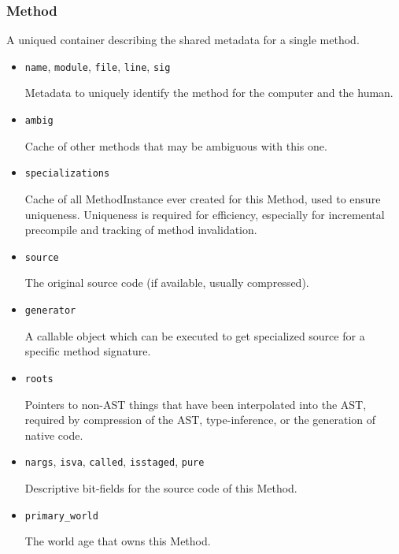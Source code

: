 \hypertarget{10862348325946528961}{}


\subsubsection{Method}



A unique{\textquotesingle}d container describing the shared metadata for a single method.



\begin{itemize}
\item \texttt{name}, \texttt{module}, \texttt{file}, \texttt{line}, \texttt{sig}

Metadata to uniquely identify the method for the computer and the human.


\item \texttt{ambig}

Cache of other methods that may be ambiguous with this one.


\item \texttt{specializations}

Cache of all MethodInstance ever created for this Method, used to ensure uniqueness. Uniqueness is required for efficiency, especially for incremental precompile and tracking of method invalidation.


\item \texttt{source}

The original source code (if available, usually compressed).


\item \texttt{generator}

A callable object which can be executed to get specialized source for a specific method signature.


\item \texttt{roots}

Pointers to non-AST things that have been interpolated into the AST, required by compression of the AST, type-inference, or the generation of native code.


\item \texttt{nargs}, \texttt{isva}, \texttt{called}, \texttt{isstaged}, \texttt{pure}

Descriptive bit-fields for the source code of this Method.


\item \texttt{primary\_world}

The world age that {\textquotedbl}owns{\textquotedbl} this Method.

\end{itemize}



